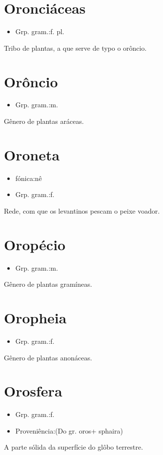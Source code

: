 \section{Oronciáceas}
\begin{itemize}
\item {Grp. gram.:f. pl.}
\end{itemize}
Tribo de plantas, a que serve de typo o orôncio.
\section{Orôncio}
\begin{itemize}
\item {Grp. gram.:m.}
\end{itemize}
Gênero de plantas aráceas.
\section{Oroneta}
\begin{itemize}
\item {fónica:nê}
\end{itemize}
\begin{itemize}
\item {Grp. gram.:f.}
\end{itemize}
Rede, com que os levantinos pescam o peixe voador.
\section{Oropécio}
\begin{itemize}
\item {Grp. gram.:m.}
\end{itemize}
Gênero de plantas gramíneas.
\section{Oropheia}
\begin{itemize}
\item {Grp. gram.:f.}
\end{itemize}
Gênero de plantas anonáceas.
\section{Orosfera}
\begin{itemize}
\item {Grp. gram.:f.}
\end{itemize}
\begin{itemize}
\item {Proveniência:(Do gr. \textunderscore oros\textunderscore  + \textunderscore sphaira\textunderscore )}
\end{itemize}
A parte sólida da superfície do glôbo terrestre.
